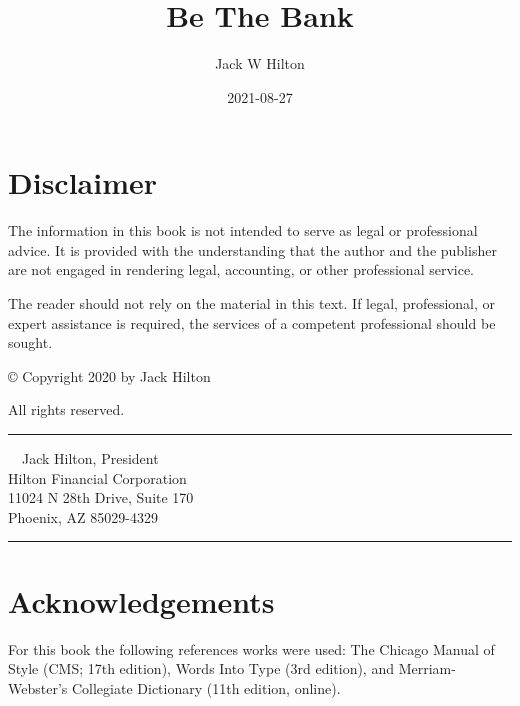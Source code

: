 \documentclass[
]{book}
\title{Be The Bank}
\author{Jack W Hilton}
\date{2021-08-27}
\begin{document}
\maketitle

{
\setcounter{tocdepth}{1}
\tableofcontents
}
\hypertarget{disclaimer}{%
\chapter*{Disclaimer}\label{disclaimer}}


The information in this book is not intended to serve as legal or professional advice.
It is provided with the understanding that the author and the publisher are not engaged in rendering legal, accounting, or other professional service.

The reader should not rely on the material in this text.
If legal, professional, or expert assistance is required, the services of a competent professional should be sought.

© Copyright 2020 by Jack Hilton

All rights reserved.

\begin{center}\rule{0.5\linewidth}{0.5pt}\end{center}

~~Jack Hilton, President\\
\hspace*{0.333em}\hspace*{0.333em}Hilton Financial Corporation\\
\hspace*{0.333em}\hspace*{0.333em}11024 N 28th Drive, Suite 170\\
\hspace*{0.333em}\hspace*{0.333em}Phoenix, AZ 85029-4329

\begin{center}\rule{0.5\linewidth}{0.5pt}\end{center}

\hypertarget{acknowledgements}{%
\chapter*{Acknowledgements}\label{acknowledgements}}


For this book the following references works were used:
The Chicago Manual of Style (CMS; 17th edition),
Words Into Type (3rd edition),
and Merriam-Webster's Collegiate Dictionary (11th edition, online).
\end{document}
